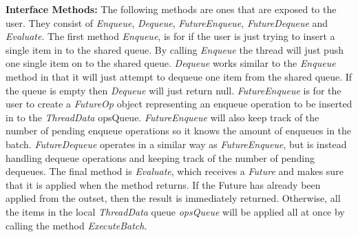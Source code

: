 \textbf{Interface Methods: } The following methods are ones that are exposed to the user. They consist of \textit{Enqueue}, \textit{Dequeue}, \textit{FutureEnqueue}, \textit{FutureDequeue} and \textit{Evaluate}. The first method \textit{Enqueue}, is for if the user is just trying to insert a single item in to the shared queue. By calling \textit{Enqueue} the thread will just push one single item on to the shared queue. \textit{Dequeue} works similar to the \textit{Enqueue} method in that it will just attempt to dequeue one item from the shared queue. If the queue is empty then \textit{Dequeue} will just return null. \textit{FutureEnqueue} is for the user to create a \textit{FutureOp} object representing an enqueue operation to be inserted in to the \textit{ThreadData} opsQueue. \textit{FutureEnqueue} will also keep track of the number of pending enqueue operations so it knows the amount of enqueues in the batch. \textit{FutureDequeue} operates in a similar way as \textit{FutureEnqueue}, but is instead handling dequeue operations and keeping track of the number of pending dequeues. The final method is \textit{Evaluate}, which receives a \textit{Future} and makes sure that it is applied when the method returns. If the Future has already been applied from the outset, then the result is immediately returned. Otherwise, all the items in the local \textit{ThreadData} queue \textit{opsQueue} will be applied all at once by calling the method \textit{ExecuteBatch}.

